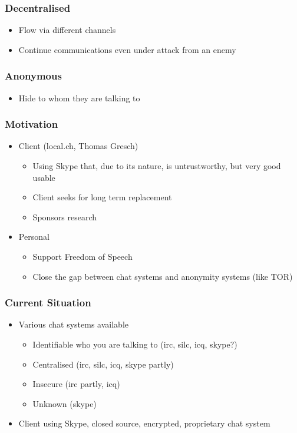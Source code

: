 \documentclass{beamer}
\begin{document}
\frame
{
  \frametitle{Decentralised}
  \begin{itemize}
  \item Flow via different channels
  \item Continue communications even under attack from an enemy
  \end{itemize}
}


\frame
{
  \frametitle{Anonymous}
  \begin{itemize}
  \item Hide to whom they are talking to
  \end{itemize}
}

\frame
{
  \frametitle{Motivation}
  \begin{itemize}
     \item Client (local.ch, Thomas Gresch)
     \begin{itemize}
        \item Using Skype that, due to its nature, is untrustworthy, but very good usable
        \item Client seeks for long term replacement 
        \item Sponsors research
    \end{itemize}
     \item Personal
     \begin{itemize}
        \item Support Freedom of Speech
        \item Close the gap between chat systems and anonymity systems (like TOR)
    \end{itemize}
  \end{itemize}
}


\frame
{
  \frametitle{Current Situation}
  \begin{itemize}
      \item Various chat systems available
      \begin{itemize}
          \item Identifiable who you are talking to (irc, silc, icq, skype?)
          \item Centralised (irc, silc, icq, skype partly)
          \item Insecure (irc partly, icq)
          \item Unknown (skype)
      \end{itemize}
      \item Client using Skype, closed source, encrypted, proprietary chat system
  \end{itemize}
}
\end{document}
